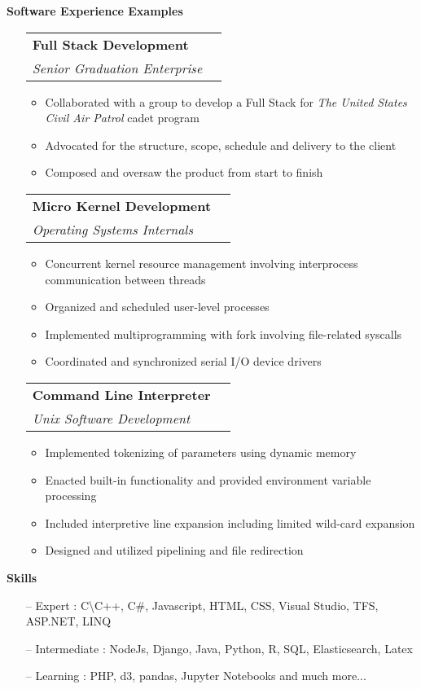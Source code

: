 \documentclass[letterpaper,11pt]{article}
\makeatletter
\newcommand{\resitem}[1]{\item #1 \vspace{-2pt}}
\newcommand{\resheading}[1]{{\large \colorbox{mygrey}{\begin{minipage}{\textwidth}{\textbf{#1 \vphantom{p\^{E}}}}\end{minipage}}}}
\newcommand{\ressubheading}[4]{
\begin{tabular*}{7.0in}{l@{\extracolsep{\fill}}r}
		\textbf{#1} & #2 \\
		\textit{#3} & \textit{#4} \\
\end{tabular*}\vspace{-6pt}}
\makeatother
\begin{document}
\resheading{Software Experience Examples}
\begin{itemize}
\item[]
	\ressubheading{Full Stack Development}{}{Senior Graduation Enterprise}{}
	\begin{itemize}
		\resitem{Collaborated with a group to develop a Full Stack for \emph{The United States Civil Air Patrol} cadet program}
		\resitem{Advocated for the structure, scope, schedule and delivery to the client}
		\resitem{Composed and oversaw the product from start to finish}
	\end{itemize}
\item[]
	\ressubheading{Micro Kernel Development}{}{Operating Systems Internals}{}
	\begin{itemize}
		\resitem{Concurrent kernel resource management involving interprocess communication between threads}
		\resitem{Organized and scheduled user-level processes}
		\resitem{Implemented multiprogramming with fork involving file-related syscalls}
		\resitem{Coordinated and synchronized serial I/O device drivers}
	\end{itemize}
\item[]
	\ressubheading{Command Line Interpreter}{}{Unix Software Development}{}
	\begin{itemize}
		\resitem{Implemented tokenizing of parameters using dynamic memory}
		\resitem{Enacted built-in functionality and provided environment variable processing}
		\resitem{Included interpretive line expansion including limited wild-card expansion}
		\resitem{Designed and utilized pipelining and file redirection}
	\end{itemize}
\end{itemize}

\resheading{Skills}
\begin{itemize}
\item[--] Expert : C\textbackslash C++, C\#, Javascript, HTML, CSS, Visual Studio, TFS, ASP.NET, LINQ\\
\item[--] Intermediate : NodeJs, Django, Java, Python, R, SQL, Elasticsearch, Latex\\
\item[--] Learning : PHP, d3, pandas, Jupyter Notebooks and much more...
\end{itemize}
\end{document}
